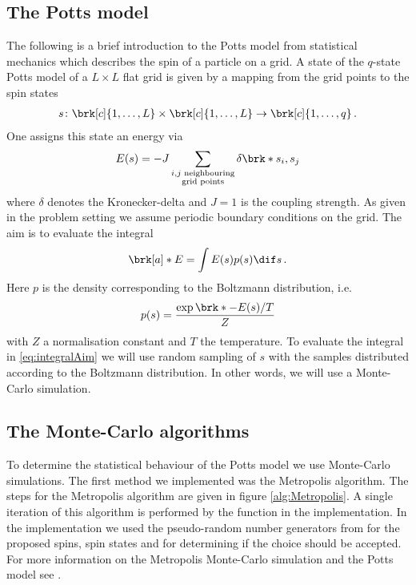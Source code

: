 \subsection{The Potts model}

The following is a brief introduction to the Potts model from statistical mechanics which describes the spin of a particle on a grid.
A state of the $q$-state Potts model of a $L\times L$ flat grid is given by a mapping from the grid points to the spin states
\begin{align*}
	s\colon \brk[c]{1,\dots,L}\times\brk[c]{1,\dots,L}\to\brk[c]{1,\dots,q}\,.
\end{align*}
One assigns this state an energy via
\begin{align*}
	E(s) = -J\sum_{\substack{i, j\text{ neighbouring}\\ \text{grid points}}}\delta\brk*{s_i,s_j}
\end{align*}
where $\delta$ denotes the Kronecker-delta and $J=1$ is the coupling strength. As given in the problem setting we assume periodic boundary conditions on the grid. The aim is to evaluate the integral
\begin{align}
	\brk[a]*{E} = \int E(s)p(s) \dif s\,.\label{eq:integralAim}
\end{align}
Here $p$ is the density corresponding to the Boltzmann distribution, i.e.\
\begin{align*}
	p(s) = \frac{\exp\brk*{-E(s)/T}}{Z}
\end{align*}
with $Z$ a normalisation constant and $T$ the temperature. To evaluate the integral in \eqref{eq:integralAim} we will use random sampling of $s$ with the samples distributed according to the Boltzmann distribution. In other words, we will use a Monte-Carlo simulation.

\subsection{The Monte-Carlo algorithms}

To determine the statistical behaviour of the Potts model we use Monte-Carlo simulations. 
The first method we implemented was the Metropolis algorithm.
The steps for the Metropolis algorithm are given in figure \ref{alg:Metropolis}. A single iteration of this algorithm is performed by the function  in the implementation. In the implementation we used the pseudo-random number generators from  for the proposed spins, spin states and for determining if the choice should be accepted. For more information on the Metropolis Monte-Carlo simulation and the Potts model see \cite{AndersIrsb}.

